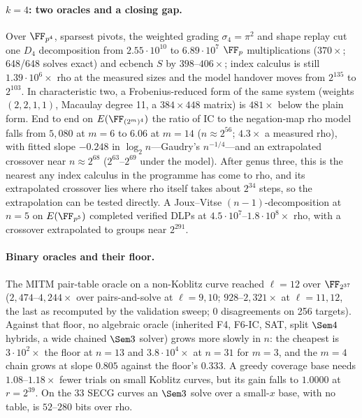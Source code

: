 \paragraph{$k=4$: two oracles and a closing gap.} Over $\FF_{p^4}$, sparsest
pivots, the weighted grading $\sigma_4=\pi^2$ and shape replay cut one $D_4$
decomposition from $2.55\cdot10^{10}$ to $6.89\cdot10^7$ $\FF_p$
multiplications ($370\times$; 648/648 solves exact) and ecbench $S$ by
$398$--$406\times$; index calculus is still $1.39\cdot10^6\times$ rho at
the measured sizes and the model handover moves from $2^{135}$ to $2^{103}$.
In characteristic two, a Frobenius-reduced form of the same system
(weights $(2,2,1,1)$, Macaulay degree 11, a $384\times448$ matrix) is
$481\times$ below the plain form. End to end on $E(\FF_{(2^m)^4})$ the
ratio of IC to the negation-map rho model falls from $5{,}080$ at $m=6$ to
$6.06$ at $m=14$ ($n\approx2^{56}$; $4.3\times$ a measured rho), with fitted
slope $-0.248$ in $\log_2 n$---Gaudry's $n^{-1/4}$---and an extrapolated
crossover near $n\approx2^{68}$ ($2^{63}$--$2^{69}$ under the model).
After genus three, this is the nearest any index calculus in the programme
has come to rho, and its extrapolated crossover lies where rho itself takes
about $2^{34}$ steps, so the extrapolation can be tested directly. A Joux--Vitse
$(n-1)$-decomposition at $n=5$ on $E(\FF_{p^5})$ completed verified DLPs at
$4.5\cdot10^7$--$1.8\cdot10^8\times$ rho, with a crossover extrapolated to
groups near $2^{291}$.

\paragraph{Binary oracles and their floor.} The MITM pair-table oracle on a
non-Koblitz curve reached $\ell=12$ over $\FF_{2^{37}}$
($2{,}474$--$4{,}244\times$ over pairs-and-solve at $\ell=9,10$;
$928$--$2{,}321\times$ at $\ell=11,12$, the last as recomputed by the
validation sweep; 0 disagreements on 256 targets).
Against that floor, no algebraic oracle (inherited F4, F6-IC, SAT, split
$\Sem4$ hybrids, a wide chained $\Sem3$ solver) grows more slowly in $n$:
the cheapest is $3\cdot10^2\times$ the floor at $n=13$ and $3.8\cdot10^4\times$
at $n=31$ for $m=3$, and the $m=4$ chain grows at slope $0.805$ against the
floor's $0.333$. A greedy coverage base needs $1.08$--$1.18\times$ fewer
trials on small Koblitz curves, but its gain falls to $1.0000$ at
$r=2^{39}$. On the 33 SECG curves an $\Sem3$ solve over a small-$x$ base,
with no table, is $52$--$280$ bits over rho.

